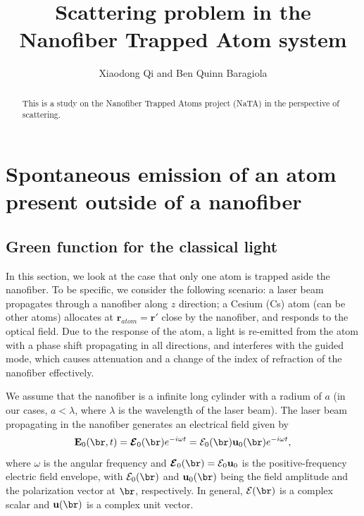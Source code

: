 \documentclass[]{report}
\title{Scattering problem in the Nanofiber Trapped Atom system}
\author{Xiaodong Qi and Ben Quinn Baragiola}
\begin{document}
\maketitle

\begin{abstract}
This is a study on the Nanofiber Trapped Atoms project (NaTA) in the perspective of scattering. 
\end{abstract}

\tableofcontents










\chapter{Spontaneous emission of an atom present outside of a nanofiber}

\section{Green function for the classical light}
In this section, we look at the case that only one atom is trapped aside the nanofiber. To be specific, we consider the following scenario: a laser beam propagates through a nanofiber along $ z $ direction; a Cesium (Cs) atom (can be other atoms) allocates at $ \mathbf{r}_{atom} =\mathbf{r}'$ close by the nanofiber, and responds to the optical field. Due to the response of the atom, a light is re-emitted
from the atom with a phase shift propagating in all directions, and interferes with the guided mode, which causes attenuation and a change of the index of refraction of the nanofiber effectively. 

We assume that the nanofiber is a infinite long cylinder with a radium of $ a $ (in our cases, $ a<\lambda $, where $ \lambda $ is the wavelength of the laser beam). The laser beam propagating in the nanofiber generates an electrical field given by
\begin{equation}
\mathbf{E}_0(\br,t)=\boldsymbol{\mathcal{E}}_0(\br)e^{-i\omega t} %
=\mathcal{E}_0(\br)\mathbf{u}_0(\br)e^{-i\omega t}, %
\label{Ert0}
\end{equation}
where $\omega$ is the angular frequency and $\boldsymbol{\mathcal{E}}_0(\br)=\mathcal{E}_0\mathbf{u}_0$ is the positive-frequency electric field envelope,
with $\mathcal{E}_0(\br)$ and $\mathbf{u}_0(\br)$ being the field amplitude and the polarization vector at $ \br $, respectively.
In general, $\mathcal{E}(\br)$ is a complex scalar and $\mathbf{u}(\br)$ is a complex unit vector. 
\end{document}
